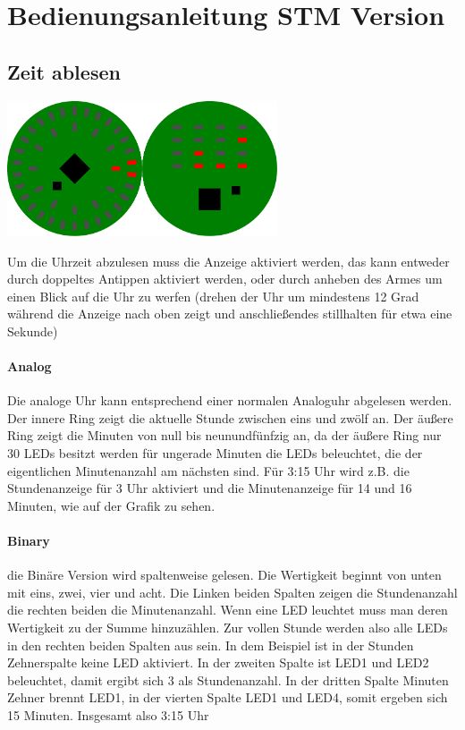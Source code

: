 \section{Bedienungsanleitung STM Version}
\subsection{Zeit ablesen}
\begin{center}
\includegraphics[width=0.6\textwidth]{../Graphics/Time3_15}
\end{center}
Um die Uhrzeit abzulesen muss die Anzeige aktiviert werden, das kann entweder durch doppeltes Antippen aktiviert werden, oder durch anheben des Armes um einen Blick auf die Uhr zu werfen (drehen der Uhr um mindestens 12 Grad während die Anzeige nach oben zeigt und anschließendes stillhalten für etwa eine Sekunde)

\paragraph{Analog}
Die analoge Uhr kann entsprechend einer normalen Analoguhr abgelesen werden. Der innere Ring zeigt die aktuelle Stunde zwischen eins und zwölf an.
Der äußere Ring zeigt die Minuten von null bis neunundfünfzig an, da der äußere Ring nur 30 LEDs besitzt werden für ungerade Minuten die LEDs beleuchtet, die der eigentlichen Minutenanzahl am nächsten sind.
Für 3:15 Uhr wird z.B. die Stundenanzeige für 3 Uhr aktiviert und die Minutenanzeige für 14 und 16 Minuten, wie auf der Grafik zu sehen.

\paragraph{Binary}
die Binäre Version wird spaltenweise gelesen. Die Wertigkeit beginnt von unten mit eins, zwei, vier und acht. Die Linken beiden Spalten zeigen die Stundenanzahl die rechten beiden die Minutenanzahl.
Wenn eine LED leuchtet muss man deren Wertigkeit zu der Summe hinzuzählen.
Zur vollen Stunde werden also alle LEDs in den rechten beiden Spalten aus sein.
In dem Beispiel ist in der Stunden Zehnerspalte keine LED aktiviert.
In der zweiten Spalte ist LED1 und LED2 beleuchtet, damit ergibt sich 3 als Stundenanzahl.
In der dritten Spalte Minuten Zehner brennt LED1, in der vierten Spalte LED1 und LED4, somit ergeben sich 15 Minuten.
Insgesamt also 3:15 Uhr
